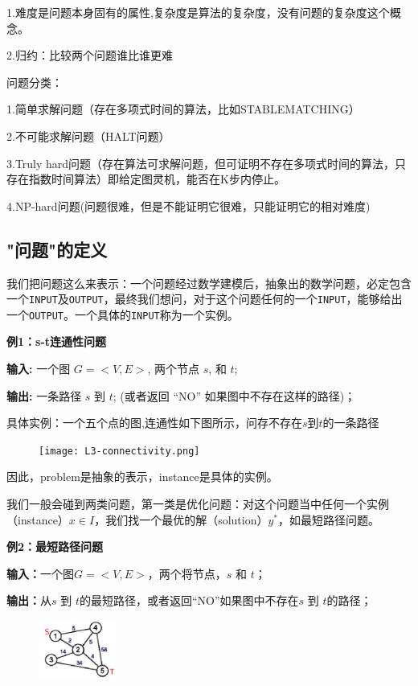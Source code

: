 1.难度是问题本身固有的属性,复杂度是算法的复杂度，没有问题的复杂度这个概念。

2.归约：比较两个问题谁比谁更难

问题分类：

1.简单求解问题（存在多项式时间的算法，比如STABLEMATCHING）

2.不可能求解问题（HALT问题）

3.Truly hard问题（存在算法可求解问题，但可证明不存在多项式时间的算法，只存在指数时间算法）即给定图灵机，能否在K步内停止。

4.NP-hard问题(问题很难，但是不能证明它很难，只能证明它的相对难度)
\subsection{"问题"的定义}
 我们把问题这么来表示：一个问题经过数学建模后，抽象出的数学问题，必定包含一个\texttt{INPUT}及\texttt{OUTPUT}，最终我们想问，对于这个问题任何的一个\texttt{INPUT}，能够给出一个\texttt{OUTPUT}。一个具体的\texttt{INPUT}称为一个实例。

\textbf{例1：s-t连通性问题}

{\bf 输入:} 一个图 $G=<V,E>$, 两个节点 $s$, 和 $t$; 

{\bf 输出:} 一条路径 $s$ 到 $t$; (或者返回 ``NO'' 如果图中不存在这样的路径)；

具体实例：一个五个点的图,连通性如下图所示，问存不存在$s$到$t$的一条路径

\begin{figure}[H]
	\centering
	\texttt{[image: L3-connectivity.png]}
\end{figure}

因此，problem是抽象的表示，instance是具体的实例。

我们一般会碰到两类问题，第一类是优化问题：对这个问题当中任何一个实例（instance）$x \in I$，我们找一个最优的解（solution）$y^*$，如最短路径问题。

\textbf{例2：最短路径问题}

{\bf 输入：}一个图$G=<V,E>$，两个将节点，$s$ 和 $t$；

{\bf 输出：}从$s$ 到 $t$的最短路径，或者返回``NO''如果图中不存在$s$ 到 $t$的路径；

\begin{figure}[H]
	\centering
  \includegraphics[width=1.0in]{L3-shortestpath.png}
\end{figure}

